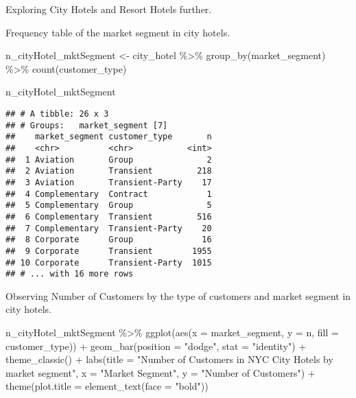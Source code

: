 \documentclass[
]{article}
\newenvironment{Shaded}{\begin{snugshade}}{\end{snugshade}}
\newcommand{\AttributeTok}[1]{\textcolor[rgb]{0.77,0.63,0.00}{#1}}
\newcommand{\FunctionTok}[1]{\textcolor[rgb]{0.00,0.00,0.00}{#1}}
\newcommand{\NormalTok}[1]{#1}
\newcommand{\OtherTok}[1]{\textcolor[rgb]{0.56,0.35,0.01}{#1}}
\newcommand{\SpecialCharTok}[1]{\textcolor[rgb]{0.00,0.00,0.00}{#1}}
\newcommand{\StringTok}[1]{\textcolor[rgb]{0.31,0.60,0.02}{#1}}
\begin{document}
Exploring City Hotels and Resort Hotels further.

Frequency table of the market segment in city hotels.

\begin{Shaded}
\begin{Highlighting}[]
\NormalTok{n\_cityHotel\_mktSegment }\OtherTok{\textless{}{-}}\NormalTok{ city\_hotel }\SpecialCharTok{\%\textgreater{}\%}
  \FunctionTok{group\_by}\NormalTok{(market\_segment) }\SpecialCharTok{\%\textgreater{}\%} \FunctionTok{count}\NormalTok{(customer\_type)}

\NormalTok{n\_cityHotel\_mktSegment}
\end{Highlighting}
\end{Shaded}

\begin{verbatim}
## # A tibble: 26 x 3
## # Groups:   market_segment [7]
##    market_segment customer_type       n
##    <chr>          <chr>           <int>
##  1 Aviation       Group               2
##  2 Aviation       Transient         218
##  3 Aviation       Transient-Party    17
##  4 Complementary  Contract            1
##  5 Complementary  Group               5
##  6 Complementary  Transient         516
##  7 Complementary  Transient-Party    20
##  8 Corporate      Group              16
##  9 Corporate      Transient        1955
## 10 Corporate      Transient-Party  1015
## # ... with 16 more rows
\end{verbatim}

Observing Number of Customers by the type of customers and market
segment in city hotels.

\begin{Shaded}
\begin{Highlighting}[]
\NormalTok{n\_cityHotel\_mktSegment }\SpecialCharTok{\%\textgreater{}\%} 
\FunctionTok{ggplot}\NormalTok{(}\FunctionTok{aes}\NormalTok{(}\AttributeTok{x =}\NormalTok{ market\_segment, }\AttributeTok{y =}\NormalTok{ n, }\AttributeTok{fill =}\NormalTok{ customer\_type)) }\SpecialCharTok{+}
  \FunctionTok{geom\_bar}\NormalTok{(}\AttributeTok{position =} \StringTok{"dodge"}\NormalTok{, }\AttributeTok{stat =} \StringTok{"identity"}\NormalTok{) }\SpecialCharTok{+}
  \FunctionTok{theme\_classic}\NormalTok{() }\SpecialCharTok{+}
  \FunctionTok{labs}\NormalTok{(}\AttributeTok{title =} \StringTok{"Number of Customers in NYC City Hotels by market segment"}\NormalTok{, }\AttributeTok{x =} \StringTok{"Market Segment"}\NormalTok{, }\AttributeTok{y =} \StringTok{"Number of Customers"}\NormalTok{) }\SpecialCharTok{+}
  \FunctionTok{theme}\NormalTok{(}\AttributeTok{plot.title =} \FunctionTok{element\_text}\NormalTok{(}\AttributeTok{face =} \StringTok{"bold"}\NormalTok{))}
\end{Highlighting}
\end{Shaded}
\end{document}

